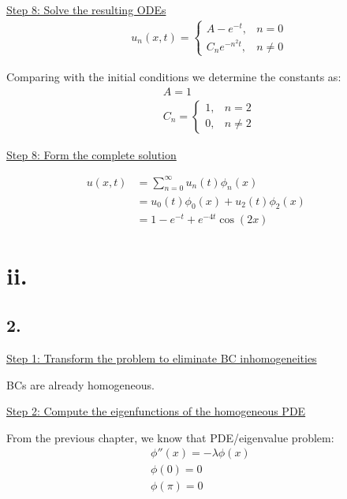 \documentclass{article}
\begin{document}
\noindent
\underline{Step 8: Solve the resulting ODEs}
\newline
\begin{align*}
  &u_n(x, t) = \begin{cases}
    A - e^{-t}, &n=0 \\
    C_n e^{-n^2 t}, &n \neq 0
  \end{cases}
\end{align*}

Comparing with the initial conditions we determine the constants as:
\begin{align*} 
  &A = 1 \\
  &C_n = \begin{cases}
    1, &n=2 \\
    0, &n \neq 2
  \end{cases}
\end{align*}


\noindent
\underline{Step 8: Form the complete solution}
\newline

\begin{align*}
  u(x, t) &= \sum_{n=0}^{\infty} u_n(t) \phi_n(x) &&\\
  &= u_0(t) \phi_0(x)
  + u_2(t) \phi_2(x) &&\\
  &= 1 - e^{-t} 
  + e^{-4t} \cos(2x)
\end{align*}
\newpage




\section*{ii.}
\subsection*{2.}

\underline{Step 1: Transform the problem to eliminate BC inhomogeneities}
\newline

BCs are already homogeneous.
\newline

\noindent
\underline{Step 2: Compute the eigenfunctions of the homogeneous PDE}
\newline

From the previous chapter, we know that PDE/eigenvalue problem:
\begin{align*}
  &\phi''(x) = -\lambda \phi(x) &&\\
  &\phi(0) = 0 &&\\
  &\phi(\pi) = 0
\end{align*}
\end{document}

